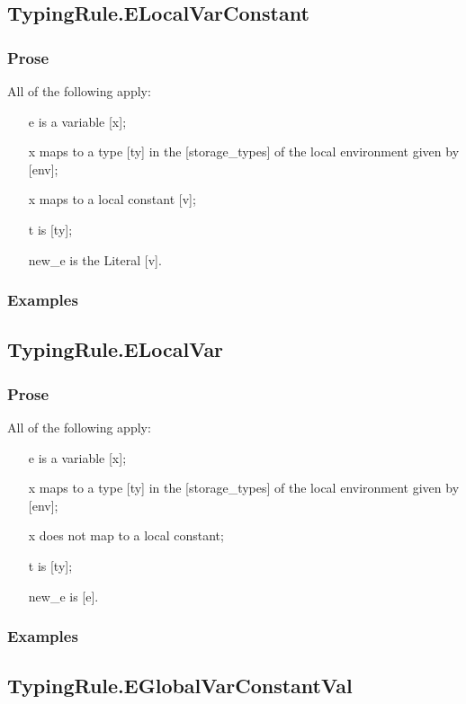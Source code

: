 \documentclass{book}
\begin{document}
\subsection{TypingRule.ELocalVarConstant}

  \subsubsection{Prose}
  All of the following apply:
  \begin{itemize}
  \item  [e] is a variable [x];
  \item  [x] maps to a type [ty] in the [storage\_types] of the local environment given by [env];
  \item  [x] maps to a local constant [v];
  \item  [t] is [ty];
  \item  [new\_e] is the Literal [v].
  \end{itemize}

  \subsubsection{Examples}

\subsection{TypingRule.ELocalVar}

  \subsubsection{Prose}
  All of the following apply:
  \begin{itemize}
  \item  [e] is a variable [x];
  \item  [x] maps to a type [ty] in the [storage\_types] of the local environment given by [env];
  \item  [x] does not map to a local constant;
  \item  [t] is [ty];
  \item  [new\_e] is [e].
  \end{itemize}

  \subsubsection{Examples}

\subsection{TypingRule.EGlobalVarConstantVal}
\end{document}
